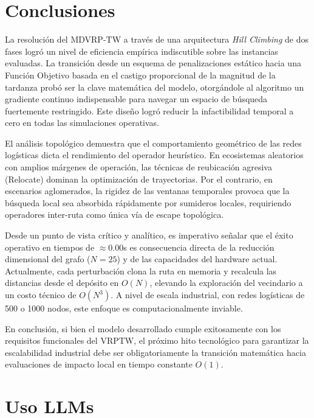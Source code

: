\documentclass[letter, 10pt]{article}
\begin{document}
\section{Conclusiones}

La resoluci\'on del MDVRP-TW a trav\'es de una arquitectura \textit{Hill Climbing} de dos fases logr\'o un nivel de eficiencia emp\'irica indiscutible sobre las instancias evaluadas. La transici\'on desde un esquema de penalizaciones est\'atico hacia una Funci\'on Objetivo basada en el castigo proporcional de la magnitud de la tardanza prob\'o ser la clave matem\'atica del modelo, otorg\'andole al algoritmo un gradiente continuo indispensable para navegar un espacio de b\'usqueda fuertemente restringido. Este dise\~no logr\'o reducir la infactibilidad temporal a cero en todas las simulaciones operativas.

El an\'alisis topol\'ogico demuestra que el comportamiento geom\'etrico de las redes log\'isticas dicta el rendimiento del operador heur\'istico. En ecosistemas aleatorios con amplios m\'argenes de operaci\'on, las t\'ecnicas de reubicaci\'on agresiva (Relocate) dominan la optimizaci\'on de trayectorias. Por el contrario, en escenarios aglomerados, la rigidez de las ventanas temporales provoca que la b\'usqueda local sea absorbida r\'apidamente por sumideros locales, requiriendo operadores inter-ruta como \'unica v\'ia de escape topol\'ogica.

Desde un punto de vista cr\'itico y anal\'itico, es imperativo se\~nalar que el \'exito operativo en tiempos de $\approx 0.00$s es consecuencia directa de la reducci\'on dimensional del grafo ($N=25$) y de las capacidades del hardware actual. Actualmente, cada perturbaci\'on clona la ruta en memoria y recalcula las distancias desde el dep\'osito en $O(N)$, elevando la exploraci\'on del vecindario a un costo t\'ecnico de $O(N^3)$. A nivel de escala industrial, con redes log\'isticas de 500 o 1000 nodos, este enfoque es computacionalmente inviable.

En conclusi\'on, si bien el modelo desarrollado cumple exitosamente con los requisitos funcionales del VRPTW, el pr\'oximo hito tecnol\'ogico para garantizar la escalabilidad industrial debe ser obligatoriamente la transici\'on matem\'atica hacia evaluaciones de impacto local en tiempo constante $O(1)$.

\section{Uso LLMs}
\end{document}
